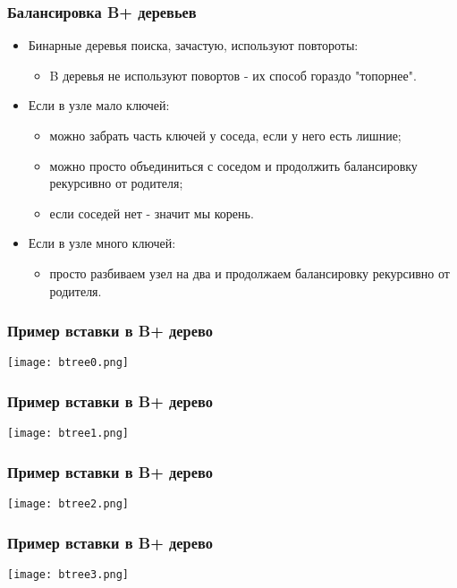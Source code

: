 \begin{frame}
\frametitle{Балансировка B+ деревьев}
\begin{itemize}
  \item Бинарные деревья поиска, зачастую, используют повтороты:
  \begin{itemize}
    \item B деревья не используют повортов - их способ гораздо "топорнее".
  \end{itemize}
  \item Если в узле мало ключей:
  \begin{itemize}
    \item можно забрать часть ключей у соседа, если у него есть лишние;
    \item можно просто объединиться с соседом и продолжить балансировку
    рекурсивно от родителя;
    \item если соседей нет - значит мы корень.
  \end{itemize}
  \item Если в узле много ключей:
  \begin{itemize}
    \item просто разбиваем узел на два и продолжаем балансировку рекурсивно от
    родителя.
  \end{itemize}
\end{itemize}
\end{frame}

\begin{frame}
\frametitle{Пример вставки в B+ дерево}
\begin{center}
  \texttt{[image: btree0.png]}
\end{center}
\end{frame}

\begin{frame}
\frametitle{Пример вставки в B+ дерево}
\begin{center}
  \texttt{[image: btree1.png]}
\end{center}
\end{frame}

\begin{frame}
\frametitle{Пример вставки в B+ дерево}
\begin{center}
  \texttt{[image: btree2.png]}
\end{center}
\end{frame}

\begin{frame}
\frametitle{Пример вставки в B+ дерево}
\begin{center}
  \texttt{[image: btree3.png]}
\end{center}
\end{frame}

